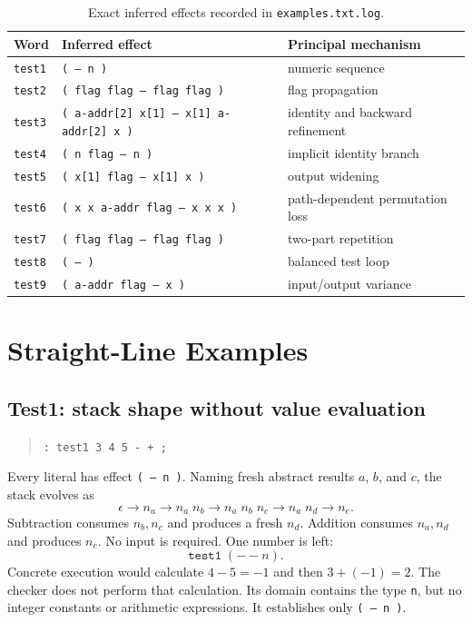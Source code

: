 \documentclass[11pt,a4paper]{article}
\newcommand{\effect}[1]{\mbox{\texttt{#1}}}
\begin{document}
\begin{table}[h]
\centering
\small
\begin{tabular}{@{}lll@{}}
\hline
Word & Inferred effect & Principal mechanism \\
\hline
\texttt{test1} & \texttt{( -- n )} & numeric sequence \\
\texttt{test2} & \texttt{( flag flag -- flag flag )} & flag propagation \\
\texttt{test3} & \texttt{( a-addr[2] x[1] -- x[1] a-addr[2] x )}
                & identity and backward refinement \\
\texttt{test4} & \texttt{( n flag -- n )} & implicit identity branch \\
\texttt{test5} & \texttt{( x[1] flag -- x[1] x )} & output widening \\
\texttt{test6} & \texttt{( x x a-addr flag -- x x x )}
                & path-dependent permutation loss \\
\texttt{test7} & \texttt{( flag flag -- flag flag )} & two-part repetition \\
\texttt{test8} & \texttt{( -- )} & balanced test loop \\
\texttt{test9} & \texttt{( a-addr flag -- x )} & input/output variance \\
\hline
\end{tabular}
\caption{Exact inferred effects recorded in \texttt{examples.txt.log}.}
\label{tab:results}
\end{table}

\section{Straight-Line Examples}
\label{sec:sequence-examples}

\subsection{Test1: stack shape without value evaluation}

\begin{quote}
\texttt{: test1  3 4 5 - + ;}
\end{quote}
Every literal has effect \effect{( -- n )}.  Naming fresh abstract results
$a$, $b$, and $c$, the stack evolves as
\[
 \epsilon
 \longrightarrow n_a
 \longrightarrow n_a\;n_b
 \longrightarrow n_a\;n_b\;n_c
 \longrightarrow n_a\;n_d
 \longrightarrow n_e.
\]
Subtraction consumes $n_b,n_c$ and produces a fresh $n_d$.  Addition consumes
$n_a,n_d$ and produces $n_e$.  No input is required.  One number is left:
\[
                      \texttt{test1}\;( -- n ).
\]
Concrete execution would calculate $4-5=-1$ and then $3+(-1)=2$.  The checker
does not perform that calculation.  Its domain contains the type \texttt{n},
but no integer constants or arithmetic expressions.  It establishes only
\effect{( -- n )}.
\end{document}
